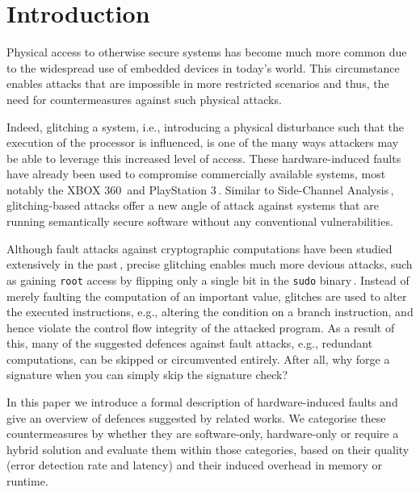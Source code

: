 %
%

\chapter{Introduction}
Physical access to otherwise secure systems has become much more common due to the widespread use of embedded devices in today's world. This circumstance enables attacks that are impossible in more restricted scenarios and thus, the need for countermeasures against such physical attacks. 

Indeed, glitching a system, i.e., introducing a physical disturbance such that the execution of the processor is influenced, is one of the many ways attackers may be able to leverage this increased level of access. These hardware-induced faults have already been used to compromise commercially available systems, most notably the XBOX 360\,\cite{free60} and PlayStation 3\,\cite{ps3hyper}. Similar to Side-Channel Analysis\,\cite{standaert2010introduction}, glitching-based attacks offer a new angle of attack against systems that are running semantically secure software without any conventional vulnerabilities.

Although fault attacks against cryptographic computations have been studied extensively in the past\,\cite{boneh1997importance}, precise glitching enables much more devious attacks, such as gaining \texttt{root} access by flipping only a single bit in the \texttt{sudo} binary\,\cite{gruss2018another}. Instead of merely faulting the computation of an important value, glitches are used to alter the executed instructions, e.g., altering the condition on a branch instruction, and hence violate the control flow integrity of the attacked program.  As a result of this, many of the suggested defences against fault attacks, e.g., redundant computations\cite{chang2019evaluating}, can be skipped or circumvented entirely. After all, why forge a signature when you can simply skip the signature check?

In this paper we introduce a formal description of hardware-induced faults and give an overview of  defences suggested by related works. We categorise these countermeasures by whether they are software-only, hardware-only or require a hybrid solution and evaluate them within those categories, based on their quality (error detection rate and latency) and their induced overhead in memory or runtime.


